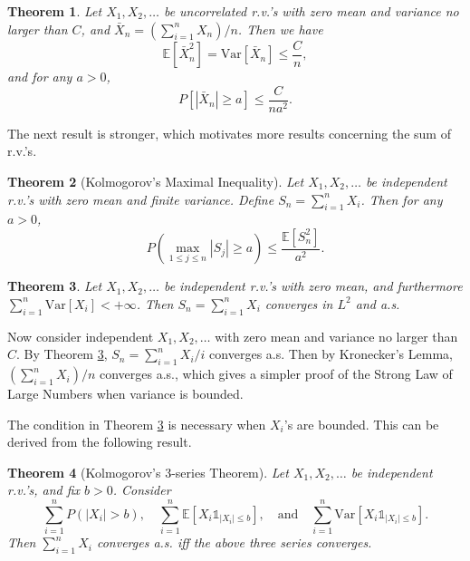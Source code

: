 \documentclass[openany]{book}
\newtheorem{theorem}{Theorem}[chapter]
\theoremstyle{definition}
\theoremstyle{remark}
\begin{document}
\begin{theorem}\label{thm:L2WeakLaw}
    Let $X_1,X_2,\ldots$ be uncorrelated r.v.'s with zero mean and variance no larger than $C$, and $\bar{X}_n=(\sum_{i=1}^{n}X_n)/n$. Then we have
    \begin{equation*}
        \mathbb{E}\left[\bar{X}_n^2\right]=\mathrm{Var}\left[\bar{X}_n\right]\le \frac{C}{n},
    \end{equation*}
    and for any $a>0$,
    \begin{equation*}
        P\left[\left|\bar{X}_n\right|\ge a\right]\le \frac{C}{na^2}.
    \end{equation*}
\end{theorem}
The next result is stronger, which motivates more results concerning the sum of r.v.'s.
\begin{theorem}[Kolmogorov's Maximal Inequality]
    Let $X_1,X_2,\ldots$ be independent r.v.'s with zero mean and finite variance. Define $S_n=\sum_{i=1}^{n}X_i$. Then for any $a>0$,
    \begin{equation*}
        P\left(\max_{1\le j\le n}|S_j|\ge a\right)\le \frac{\mathbb{E}[S_n^2]}{a^2}.
    \end{equation*}
\end{theorem}
\begin{theorem}\label{thm:L2Convergence}
    Let $X_1,X_2,\ldots$ be independent r.v.'s with zero mean, and furthermore $\sum_{i=1}^{n}\mathrm{Var}[X_i]<+\infty$. Then $S_n=\sum_{i=1}^{n}X_i$ converges in $L^2$ and a.s.
\end{theorem}
Now consider independent $X_1,X_2,\ldots$ with zero mean and variance no larger than $C$. By Theorem \ref{thm:L2Convergence}, $S_n=\sum_{i=1}^{n}X_i/i$ converges a.s. Then by Kronecker's Lemma, $\left(\sum_{i=1}^{n}X_i\right)/n$ converges a.s., which gives a simpler proof of the Strong Law of Large Numbers when variance is bounded.

The condition in Theorem \ref{thm:L2Convergence} is necessary when $X_i$'s are bounded. This can be derived from the following result.
\begin{theorem}[Kolmogorov's 3-series Theorem]
    Let $X_1,X_2,\ldots$ be independent r.v.'s, and fix $b>0$. Consider
    \begin{equation*}
        \sum_{i=1}^{n}P\left(|X_i|>b\right),\quad \sum_{i=1}^{n}\mathbb{E}\left[X_i\mathds{1}_{|X_i|\le b}\right],\quad\textrm{and}\quad \sum_{i=1}^{n}\mathrm{Var}\left[X_i\mathds{1}_{|X_i|\le b}\right].
    \end{equation*}
    Then $\sum_{i=1}^{n}X_i$ converges a.s. iff the above three series converges.
\end{theorem}
\end{document}
